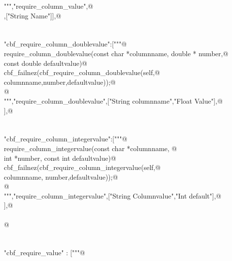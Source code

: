 \documentclass[10pt,a4paper,twoside,notitlepage]{article}
\begin{document}
\begin{flushleft}
\begin{list}{}{}
\mbox{}\verb@""","require_column_value",@\\
\mbox{},["String Name"]],@\\
\mbox{}\verb@@\\
\mbox{}\verb@@\\
\mbox{}\verb@"cbf_require_column_doublevalue":["""@\\
\mbox{}\verb@%apply double *OUTPUT { double *number} require_column_doublevalue;@\\
\mbox{}\verb@void require_column_doublevalue(const char *columnname, double * number,@\\
\mbox{}\verb@             const double defaultvalue){@\\
\mbox{}\verb@    cbf_failnez(cbf_require_column_doublevalue(self,@\\
\mbox{}\verb@                  columnname,number,defaultvalue));@\\
\mbox{}\verb@    }@\\
\mbox{}\verb@""","require_column_doublevalue",["String columnname","Float Value"],@\\
\mbox{}],@\\
\mbox{}\verb@@\\
\mbox{}\verb@@\\
\mbox{}\verb@"cbf_require_column_integervalue":["""@\\
\mbox{}\verb@%apply int *OUTPUT {int *number}  require_column_integervalue;@\\
\mbox{}\verb@void require_column_integervalue(const char *columnname, @\\
\mbox{}\verb@                       int *number, const int defaultvalue){@\\
\mbox{}\verb@    cbf_failnez(cbf_require_column_integervalue(self,@\\
\mbox{}\verb@           columnname, number,defaultvalue));@\\
\mbox{}\verb@    }@\\
\mbox{}\verb@""","require_column_integervalue",["String Columnvalue","Int default"],@\\
\mbox{}],@\\
\mbox{}\verb@@\\
\mbox{}\verb@           @\\
\mbox{}\verb@@\\
\mbox{}\verb@@\\
\mbox{}\verb@"cbf_require_value" : ["""@\\

\end{list}
\end{flushleft}
\end{document}

